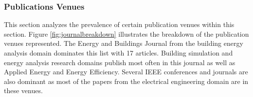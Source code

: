 \subsubsection{Publications Venues}
This section analyzes the prevalence of certain publication venues within this section. Figure \ref{fig:journalbreakdown} illustrates the breakdown of the publication venues represented. The Energy and Buildings Journal from the building energy analysis domain dominates this list with 17 articles. Building simulation and energy analysis research domains publish most often in this journal as well as Applied Energy and Energy Efficiency. Several IEEE conferences and journals are also dominant as most of the papers from the electrical engineering domain are in these venues.